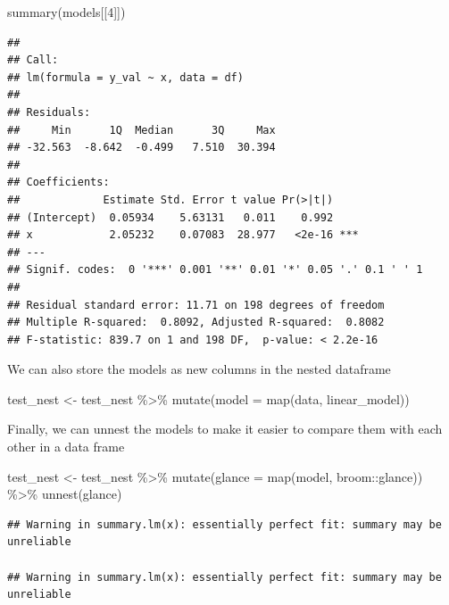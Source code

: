 \documentclass[
]{book}
\newenvironment{Shaded}{\begin{snugshade}}{\end{snugshade}}
\newcommand{\AttributeTok}[1]{\textcolor[rgb]{0.77,0.63,0.00}{#1}}
\newcommand{\DecValTok}[1]{\textcolor[rgb]{0.00,0.00,0.81}{#1}}
\newcommand{\FunctionTok}[1]{\textcolor[rgb]{0.00,0.00,0.00}{#1}}
\newcommand{\NormalTok}[1]{#1}
\newcommand{\OtherTok}[1]{\textcolor[rgb]{0.56,0.35,0.01}{#1}}
\newcommand{\SpecialCharTok}[1]{\textcolor[rgb]{0.00,0.00,0.00}{#1}}
\begin{document}
\begin{Shaded}
\begin{Highlighting}[]
\FunctionTok{summary}\NormalTok{(models[[}\DecValTok{4}\NormalTok{]])}
\end{Highlighting}
\end{Shaded}

\begin{verbatim}
## 
## Call:
## lm(formula = y_val ~ x, data = df)
## 
## Residuals:
##     Min      1Q  Median      3Q     Max 
## -32.563  -8.642  -0.499   7.510  30.394 
## 
## Coefficients:
##             Estimate Std. Error t value Pr(>|t|)    
## (Intercept)  0.05934    5.63131   0.011    0.992    
## x            2.05232    0.07083  28.977   <2e-16 ***
## ---
## Signif. codes:  0 '***' 0.001 '**' 0.01 '*' 0.05 '.' 0.1 ' ' 1
## 
## Residual standard error: 11.71 on 198 degrees of freedom
## Multiple R-squared:  0.8092, Adjusted R-squared:  0.8082 
## F-statistic: 839.7 on 1 and 198 DF,  p-value: < 2.2e-16
\end{verbatim}

We can also store the models as new columns in the nested dataframe

\begin{Shaded}
\begin{Highlighting}[]
\NormalTok{test\_nest }\OtherTok{\textless{}{-}}\NormalTok{ test\_nest }\SpecialCharTok{\%\textgreater{}\%} 
  \FunctionTok{mutate}\NormalTok{(}\AttributeTok{model =} \FunctionTok{map}\NormalTok{(data, linear\_model))}
\end{Highlighting}
\end{Shaded}

Finally, we can unnest the models to make it easier to compare them with each other in a data frame

\begin{Shaded}
\begin{Highlighting}[]
\NormalTok{test\_nest }\OtherTok{\textless{}{-}}\NormalTok{ test\_nest }\SpecialCharTok{\%\textgreater{}\%} 
  \FunctionTok{mutate}\NormalTok{(}\AttributeTok{glance =} \FunctionTok{map}\NormalTok{(model, broom}\SpecialCharTok{::}\NormalTok{glance)) }\SpecialCharTok{\%\textgreater{}\%} 
  \FunctionTok{unnest}\NormalTok{(glance)}
\end{Highlighting}
\end{Shaded}

\begin{verbatim}
## Warning in summary.lm(x): essentially perfect fit: summary may be unreliable

## Warning in summary.lm(x): essentially perfect fit: summary may be unreliable
\end{verbatim}
\end{document}
